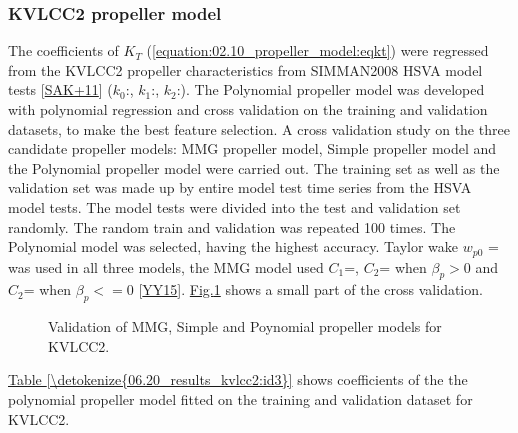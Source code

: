 \documentclass[review]{elsarticle}
\begin{document}
\subsubsection{KVLCC2 propeller model}
\label{\detokenize{06.20_results_kvlcc2:kvlcc2-propeller-model}}
\sphinxAtStartPar
The coefficients of \(K_T\) (\autoref{equation:02.10_propeller_model:eqkt}) were regressed from the KVLCC2 propeller characteristics from SIMMAN2008 HSVA model tests {[}\hyperlink{cite.bibligraphy:id79}{SAK+11}{]} (\(k_0\):, \(k_1\):, \(k_2\):).
The Polynomial propeller model was developed with polynomial regression and cross validation on the training and validation datasets, to make the best feature selection.
A cross validation study on the three candidate propeller models: MMG propeller model, Simple propeller model and the Polynomial propeller model were carried out. The training set as well as the validation set was made up by entire model test time series from the HSVA model tests.
The model tests were divided into the test and validation set randomly. The random train and validation was repeated 100 times. The Polynomial model was selected, having the highest accuracy. Taylor wake \(w_{p0}\) =  was used in all three models, the MMG model used \(C_1\)=, \(C_2\)= when \(\beta_p>0\) and \(C_2\)= when \(\beta_p<=0\) {[}\hyperlink{cite.bibligraphy:id22}{YY15}{]}. \hyperref[\detokenize{06.20_results_kvlcc2:fig-propeller-validation}]{Fig.\@ \ref{\detokenize{06.20_results_kvlcc2:fig-propeller-validation}}} shows a small part of the cross validation.

\begin{figure}[H]
\centering
\capstart

\noindent{}
\caption{Validation of MMG, Simple and Poynomial propeller models for KVLCC2.}\label{\detokenize{06.20_results_kvlcc2:fig-propeller-validation}}\end{figure}

\hyperref[\detokenize{06.20_results_kvlcc2:id3}]{Table \ref{\detokenize{06.20_results_kvlcc2:id3}}} shows coefficients of the the polynomial propeller model fitted on the training and validation dataset for KVLCC2.
\end{document}
